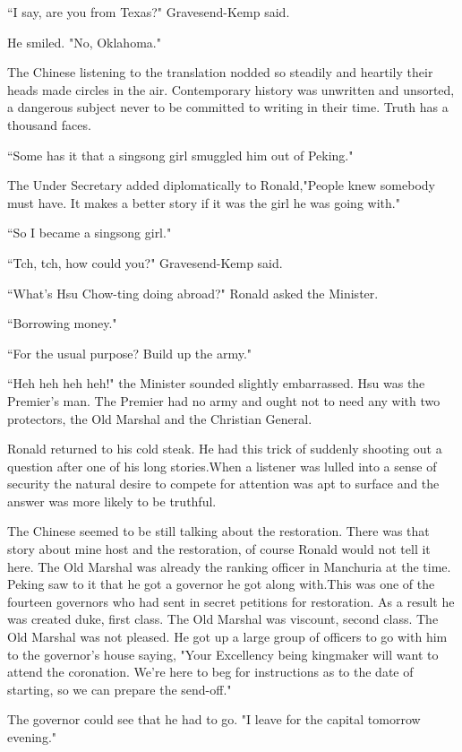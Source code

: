 \par ``I say, are you from Texas?" Gravesend-Kemp said.
\par He smiled. "No, Oklahoma."
\par The Chinese listening to the translation nodded so steadily and heartily their heads made circles in the air. Contemporary history was unwritten and unsorted, a dangerous subject never to be committed to writing in their time. Truth has a thousand faces.
\par ``Some has it that a singsong girl smuggled him out of Peking."
\par The Under Secretary added diplomatically to Ronald,"People knew somebody must have. It makes a better story if it was the girl he was going with."
\par ``So I became a singsong girl."
\par ``Tch, tch, how could you?" Gravesend-Kemp said.
\par ``What's Hsu Chow-ting doing abroad?" Ronald asked the Minister.
\par ``Borrowing money."
\par ``For the usual purpose? Build up the army."
\par ``Heh heh heh heh!" the Minister sounded slightly embarrassed. Hsu was the Premier's man. The Premier had no army and ought not to need any with two protectors, the Old Marshal and the Christian General.
\par Ronald returned to his cold steak. He had this trick of suddenly shooting out a question after one of his long stories.When a listener was lulled into a sense of security the natural desire to compete for attention was apt to surface and the answer was more likely to be truthful.
\par The Chinese seemed to be still talking about the restoration. There was that story about mine host and the restoration, of course Ronald would not tell it here. The Old Marshal was already the ranking officer in Manchuria at the time. Peking saw to it that he got a governor he got along with.This was one of the fourteen governors who had sent in secret petitions for restoration. As a result he was created duke, first class. The Old Marshal was viscount, second class. The Old Marshal was not pleased. He got up a large group of officers to go with him to the governor's house saying, "Your Excellency being kingmaker will want to attend the coronation. We're here to beg for instructions as to the date of starting, so we can prepare the send-off."
\par The governor could see that he had to go. "I leave for the capital tomorrow evening."
